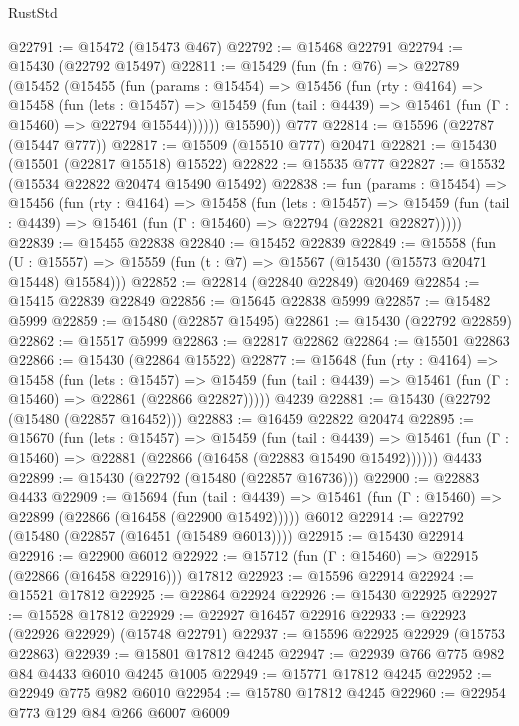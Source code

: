 \begin{lexlean}{RustStd}
\begin{coremodule}
{\begin{coremodule}
{{{{{{{{{{{{{{{{{{{{{{{{{{{{{{{{{{{{{{{{{{{{{{{{{{{{{{{{{{{{@22791 := @15472 (@15473 @467)
@22792 := @15468 @22791
@22794 := @15430 (@22792 @15497)
@22811 := @15429
    (fun (fn : @76) =>
    @22789
      (@15452
        (@15455
          (fun (params : @15454) =>
          @15456
            (fun (rty : @4164) =>
            @15458
              (fun (lets : @15457) =>
              @15459 (fun (tail : @4439) => @15461 (fun (Γ : @15460) => @22794 @15544))))))
        @15590))
    @777
@22814 := @15596 (@22787 (@15447 @777))
@22817 := @15509 (@15510 @777) @20471
@22821 := @15430 (@15501 (@22817 @15518) @15522)
@22822 := @15535 @777
@22827 := @15532 (@15534 @22822 @20474 @15490 @15492)
@22838 := fun (params : @15454) =>
  @15456
    (fun (rty : @4164) =>
    @15458
      (fun (lets : @15457) =>
      @15459 (fun (tail : @4439) => @15461 (fun (Γ : @15460) => @22794 (@22821 @22827)))))
@22839 := @15455 @22838
@22840 := @15452 @22839
@22849 := @15558
    (fun (U : @15557) => @15559 (fun (t : @7) => @15567 (@15430 (@15573 @20471 @15448) @15584)))
@22852 := @22814 (@22840 @22849) @20469
@22854 := @15415 @22839 @22849
@22856 := @15645 @22838 @5999
@22857 := @15482 @5999
@22859 := @15480 (@22857 @15495)
@22861 := @15430 (@22792 @22859)
@22862 := @15517 @5999
@22863 := @22817 @22862
@22864 := @15501 @22863
@22866 := @15430 (@22864 @15522)
@22877 := @15648
    (fun (rty : @4164) =>
    @15458
      (fun (lets : @15457) =>
      @15459 (fun (tail : @4439) => @15461 (fun (Γ : @15460) => @22861 (@22866 @22827)))))
    @4239
@22881 := @15430 (@22792 (@15480 (@22857 @16452)))
@22883 := @16459 @22822 @20474
@22895 := @15670
    (fun (lets : @15457) =>
    @15459
      (fun (tail : @4439) =>
      @15461 (fun (Γ : @15460) => @22881 (@22866 (@16458 (@22883 @15490 @15492))))))
    @4433
@22899 := @15430 (@22792 (@15480 (@22857 @16736)))
@22900 := @22883 @4433
@22909 := @15694
    (fun (tail : @4439) => @15461 (fun (Γ : @15460) => @22899 (@22866 (@16458 (@22900 @15492)))))
    @6012
@22914 := @22792 (@15480 (@22857 (@16451 (@15489 @6013))))
@22915 := @15430 @22914
@22916 := @22900 @6012
@22922 := @15712 (fun (Γ : @15460) => @22915 (@22866 (@16458 @22916))) @17812
@22923 := @15596 @22914
@22924 := @15521 @17812
@22925 := @22864 @22924
@22926 := @15430 @22925
@22927 := @15528 @17812
@22929 := @22927 @16457 @22916
@22933 := @22923 (@22926 @22929) (@15748 @22791)
@22937 := @15596 @22925 @22929 (@15753 @22863)
@22939 := @15801 @17812 @4245
@22947 := @22939 @766 @775 @982 @84 @4433 @6010 @4245 @1005
@22949 := @15771 @17812 @4245
@22952 := @22949 @775 @982 @6010
@22954 := @15780 @17812 @4245
@22960 := @22954 @773 @129 @84 @266 @6007 @6009
}}}}}}}}}}}}}}}}}}}}}}}}}}}}}}}}}}}}}}}}}}}}}}}}}}}}}}}}}}}}
\end{coremodule}}
\end{coremodule}
\end{lexlean}
